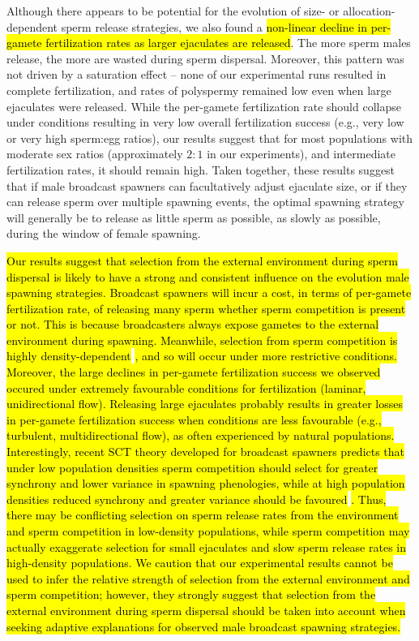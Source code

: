 \documentclass{article}
\begin{document}
Although there appears to be potential for the evolution of size- or allocation-dependent sperm release strategies, we also found a \hl{non-linear decline in per-gamete fertilization rates as larger ejaculates are released}. The more sperm males release, the more are wasted during sperm dispersal. Moreover, this pattern was not driven by a saturation effect -- none of our experimental runs resulted in complete fertilization, and rates of polyspermy remained low even when large ejaculates were released. While the per-gamete fertilization rate should collapse under conditions resulting in very low overall fertilization success (e.g., very low or very high sperm:egg ratios), our results suggest that for most populations with moderate sex ratios (approximately $2:1$ in our experiments), and intermediate fertilization rates, it should remain high. Taken together, these results suggest that if male broadcast spawners can facultatively adjust ejaculate size, or if they can release sperm over multiple spawning events, the optimal spawning strategy will generally be to release as little sperm as possible, as slowly as possible, during the window of female spawning. 

\hl{Our results suggest that selection from the external environment during sperm dispersal is likely to have a strong and consistent influence on the evolution male spawning strategies. Broadcast spawners will incur a cost, in terms of per-gamete fertilization rate, of releasing many sperm whether sperm competition is present or not. This is because broadcasters always expose gametes to the external environment during spawning. Meanwhile, selection from sperm competition is highly density-dependent} \citep{Parker1982,Levitan1998,BodeMarshall2007,Parker2017}\hl{, and so will occur under more restrictive conditions. Moreover, the large declines in per-gamete fertilization success we observed occured under extremely favourable conditions for fertilization (laminar, unidirectional flow). Releasing large ejaculates probably results in greater losses in per-gamete fertilization success when conditions are less favourable (e.g., turbulent, multidirectional flow), as often experienced by natural populations. Interestingly, recent SCT theory developed for broadcast spawners predicts that under low population densities sperm competition should select for greater synchrony and lower variance in spawning phenologies, while at high population densities reduced synchrony and greater variance should be favoured} \citep{Olito2015,Olito2017}\hl{. Thus, there may be conflicting selection on sperm release rates from the environment and sperm competition in low-density populations, while sperm competition may actually exaggerate selection for small ejaculates and slow sperm release rates in high-density populations. We caution that our experimental results cannot be used to infer the relative strength of selection from the external environment and sperm competition; however, they strongly suggest that selection from the external environment during sperm dispersal should be taken into account when seeking adaptive explanations for observed male broadcast spawning strategies.}
\end{document}
